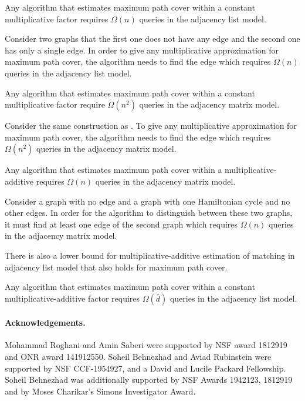 \begin{lemma}\label{lem:hardness-adjacency-list}
Any algorithm that estimates maximum path cover within a constant multiplicative factor requires $\Omega(n)$ queries in the adjacency list model.
\end{lemma}
\begin{myproof}
Consider two graphs that the first one does not have any edge and the second one has only a single edge. In order to give any multiplicative approximation for maximum path cover, the algorithm needs to find the edge which requires $\Omega(n)$ queries in the adjacency list model. 
\end{myproof}

\begin{lemma}
Any algorithm that estimates maximum path cover within a constant multiplicative factor require $\Omega(n^2)$ queries in the adjacency matrix model.
\end{lemma}
\begin{myproof}
Consider the same construction as . To give any multiplicative approximation for maximum path cover, the algorithm needs to find the edge which requires $\Omega(n^2)$ queries in the adjacency matrix model. 
\end{myproof}


\begin{lemma}
Any algorithm that estimates maximum path cover within a multiplicative-additive  requires $\Omega(n)$ queries in the adjacency matrix model.
\end{lemma}
\begin{myproof}
Consider a graph with no edge and a graph with one Hamiltonian cycle and no other edges. In order for the algorithm to distinguish between these two graphs, it must find at least one edge of the second graph which requires $\Omega(n)$ queries in the adjacency matrix model. 
\end{myproof}

There is also a lower bound for multiplicative-additive estimation of matching in adjacency list model \cite{PARNAS2007183} that also holds for maximum path cover.

\begin{lemma}
Any algorithm that estimates maximum path cover within a constant multiplicative-additive factor requires $\Omega(\bar{d})$ queries in the adjacency list model.
\end{lemma}




\paragraph{Acknowledgements.} Mohammad Roghani and Amin Saberi were supported by NSF award 1812919 and ONR award 141912550. Soheil Behnezhad and Aviad Rubinstein were supported by NSF CCF-1954927, and a David and Lucile Packard Fellowship. Soheil Behnezhad was additionally supported by NSF Awards 1942123, 1812919 and by Moses Charikar's Simons Investigator Award.